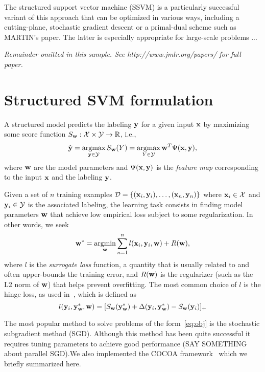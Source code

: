 \documentclass[twoside,11pt]{article}
\newcommand{\dataset}{{\cal D}}
\newcommand{\wv}{{\bf w}}
\newcommand{\xv}{{\bf x}}
\newcommand{\yv}{{\bf y}}
\newcommand{\argmax}{\operatornamewithlimits{argmax}}
\newcommand{\argmin}{\operatornamewithlimits{argmin}}
\newcommand{\0}{\mathbf{0}} %
\newcommand{\weight}{w}
\newcommand{\wv}{{\bm{\weight}}}
\begin{document}
The structured support vector machine (SSVM) is a particularly successful variant of this approach that can be optimized in various ways, including a cutting-plane, stochastic gradient descent or a primal-dual scheme such as MARTIN's paper. The latter is especially appropriate for large-scale problems ...

{\noindent \em Remainder omitted in this sample. See http://www.jmlr.org/papers/ for full paper.}

\section{Structured SVM formulation}

A structured model predicts the labeling $\yv$ for a given input $\xv$ by maximizing some score function
$S_\wv:\mathcal{X} \times \mathcal{Y} \rightarrow \mathbb{R}$,
i.e.,
%
\begin{equation}
\label{eq:inference}
\hat{\yv} = \argmax_{\yv \in \mathcal{Y}} S_\wv(Y) = \argmax_{Y \in \mathcal{Y}} \wv^T\Psi(\xv,\yv),
\end{equation}
%
where $\wv$ are the model parameters and $\Psi(\xv,\yv)$ is the \emph{feature map} corresponding to the input $\xv$ and the labeling $\yv$.


Given a set of $n$ training examples $\dataset=\{(\xv_i,\yv_i), \dots, (\xv_n, \yv_n)\}$ where $\xv_i \in \mathcal{X}$ and $\yv_i \in \mathcal{Y}$ is the associated labeling, 
the learning task consists in finding model parameters $\wv$ that achieve low empirical loss subject to some regularization. In other words, we seek
%
\begin{align}
\label{eq:obj}
\wv^* = \argmin_{\wv} \sum_{n=1}^n l(\xv_i, \yv_i, \wv) + R(\wv),
\end{align}
%
where $l$ is the \emph{surrogate loss} function,
a quantity that is usually related to and often upper-bounds the training error, 
and $R(\wv)$ is the regularizer (such as the L2 norm of $\wv$)
that helps prevent overfitting. 
The most common choice of $l$ is the hinge loss, as used in~\cite{Taskar:2003tt,Tsochantaridis:2005ww}, which is defined as
\begin{equation}
\label{eq:hinge-loss}
l(\yv_i, \yv^*_\wv, \wv) = [S_\wv(\yv^*_\wv) + \Delta(\yv_i, \yv^*_\wv) - S_\wv(\yv_i)]_+
\end{equation}


The most popular method to solve problems of the form~\eqref{eq:obj}
is the stochastic subgradient method (SGD). Although this method has
been quite successful it requires tuning parameters to achieve good
performance (SAY SOMETHING about parallel SGD).We also implemented the
COCOA framework~\cite{Jaggi:2014vi} which we briefly summarized here.
\end{document}
